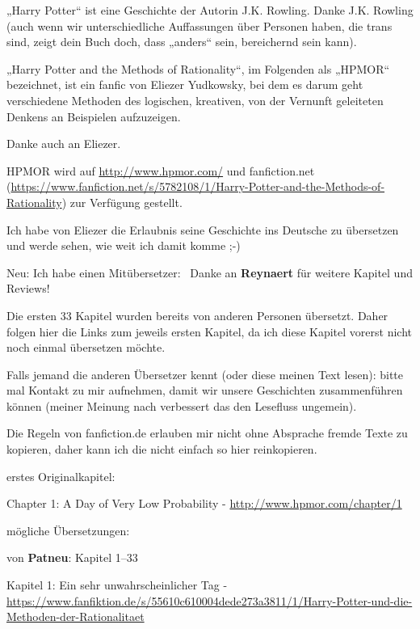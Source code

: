 

\hypertarget{vorwort-der-uxfcbersetzerin}{%

„Harry Potter“ ist eine Geschichte der Autorin J.K. Rowling. Danke J.K. Rowling (auch wenn wir unterschiedliche Auffassungen über Personen haben, die trans sind, zeigt dein Buch doch, dass „anders“ sein, bereichernd sein kann).

„Harry Potter and the Methods of Rationality“, im Folgenden als „HPMOR“ bezeichnet, ist ein fanfic von Eliezer Yudkowsky, bei dem es darum geht verschiedene Methoden des logischen, kreativen, von der Vernunft geleiteten Denkens an Beispielen aufzuzeigen.

Danke auch an Eliezer.

HPMOR wird auf \url{http://www.hpmor.com/} und fanfiction.net (\url{https://www.fanfiction.net/s/5782108/1/Harry-Potter-and-the-Methods-of-Rationality}) zur Verfügung gestellt.

Ich habe von Eliezer die Erlaubnis seine Geschichte ins Deutsche zu übersetzen und werde sehen, wie weit ich damit komme ;-)

Neu: Ich habe einen Mitübersetzer: ~Danke an \textbf{Reynaert} für weitere Kapitel und Reviews!

Die ersten 33 Kapitel wurden bereits von anderen Personen übersetzt. Daher folgen hier die Links zum jeweils ersten Kapitel, da ich diese Kapitel vorerst nicht noch einmal übersetzen möchte.

Falls jemand die anderen Übersetzer kennt (oder diese meinen Text lesen): bitte mal Kontakt zu mir aufnehmen, damit wir unsere Geschichten zusammenführen können (meiner Meinung nach verbessert das den Lesefluss ungemein).

Die Regeln von fanfiction.de erlauben mir nicht ohne Absprache fremde Texte zu kopieren, daher kann ich die nicht einfach so hier reinkopieren.

erstes Originalkapitel:

Chapter 1: A Day of Very Low Probability - \url{http://www.hpmor.com/chapter/1}

mögliche Übersetzungen:

von \textbf{Patneu}: Kapitel 1–33

Kapitel 1: Ein sehr unwahrscheinlicher Tag - \url{https://www.fanfiktion.de/s/55610c610004dede273a3811/1/Harry-Potter-und-die-Methoden-der-Rationalitaet}

}
